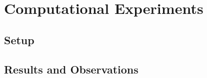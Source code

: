 \chapter{Computational Experiments}
\label{ch:experiments}



\section{Setup}


\section{Results and Observations}


